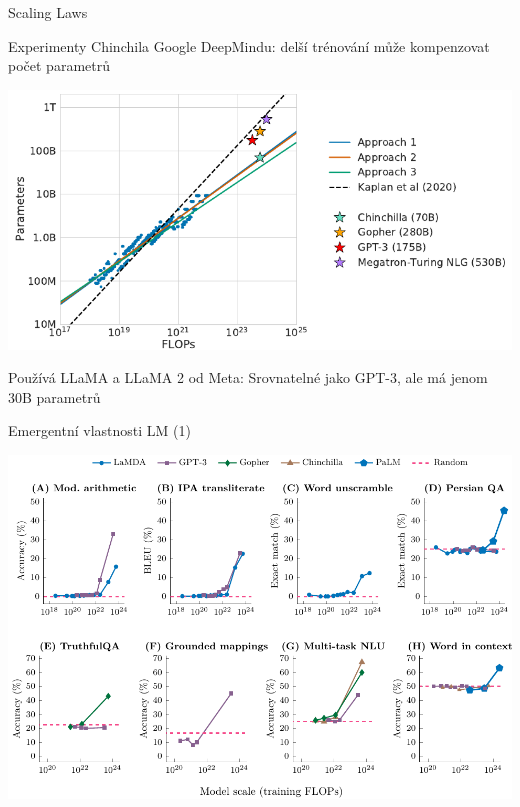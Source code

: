 \documentclass[aspectratio=169,dvipsnames]{beamer}
\begin{document}
\begin{frame}{Scaling Laws}

    \begin{center}
    Experimenty Chinchila Google DeepMindu: delší trénování může kompenzovat počet parametrů
    \citep[Figure~1]{hoffmann2022training}

    \vspace{5pt}
    \includegraphics[scale=.6]{img/chinchilla.pdf}

    \vspace{10pt}

    Používá LLaMA a LLaMA 2 od Meta: Srovnatelné jako GPT-3, ale má jenom 30B parametrů \\
    \citep{touvron2023llama}

    \end{center}

\end{frame}


\begin{frame}{Emergentní vlastnosti LM (1)}

    \centering
    \includegraphics[scale=.65]{img/emergent.pdf}\hspace{10pt}

\end{frame}
\end{document}
